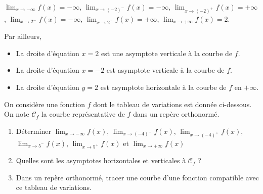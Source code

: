 \documentclass[11pt,fleqn, openany]{book} %
\begin{document}
\begin{solution}
  $\displaystyle \lim_{x \to -\infty} f(x)=-\infty$, 
 $\displaystyle \lim_{x \to (-2)^-} f(x)=-\infty$,
 $\displaystyle \lim_{x \to (-2)^+} f(x)=+\infty$,
  $\displaystyle \lim_{x \to 2^-} f(x)=-\infty$,
 $\displaystyle \lim_{x \to 2^+} f(x)=+\infty$,
 $\displaystyle \lim_{x \to +\infty} f(x)=2$.

Par ailleurs,
\begin{itemize}
\item La droite d'équation $x=2$ est une asymptote verticale à la courbe de $f$.
\item La droite d'équation $x=-2$ est asymptote verticale à la courbe de $f$.
\item La droite d'équation $y=2$ est asymptote horizontale à la courbe de $f$ en $+\infty$.
\end{itemize}\end{solution}






\begin{exercise}On considère une fonction $f$ dont le tableau de variations est donnée ci-dessous. On note $\mathcal{C}_f$ la courbe représentative de $f$ dans un repère orthonormé.

\begin{center}
\end{center}

\begin{enumerate}
\item Déterminer $\displaystyle \lim_{x \to -\infty} f(x)$, $\displaystyle \lim_{x \to (-4)^-} f(x)$, $\displaystyle \lim_{x \to (-4)^+} f(x)$, $\displaystyle \lim_{x \to 5^-} f(x)$, $\displaystyle \lim_{x \to 5^+} f(x)$ et $\displaystyle \lim_{x \to +\infty} f(x)$
\item Quelles sont les asymptotes horizontales et verticales à $\mathcal{C}_f$ ?
\item Dans un repère orthonormé, tracer une courbe d'une fonction compatible avec ce tableau de variations.
\end{enumerate}\end{exercise}
\end{document}
